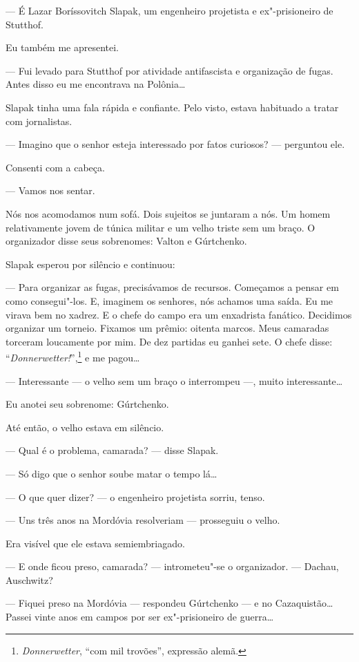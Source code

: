 --- É Lazar Boríssovitch Slapak, um engenheiro projetista e
ex"-prisioneiro de Stutthof.

Eu também me apresentei.

--- Fui levado para Stutthof por atividade antifascista e organização de
fugas. Antes disso eu me encontrava na Polônia\ldots{}

Slapak tinha uma fala rápida e confiante. Pelo visto, estava habituado a
tratar com jornalistas.

--- Imagino que o senhor esteja interessado por fatos curiosos? ---
perguntou ele.

Consenti com a cabeça.

--- Vamos nos sentar.

Nós nos acomodamos num sofá. Dois sujeitos se juntaram a nós. Um homem
relativamente jovem de túnica militar e um velho triste sem um braço. O
organizador disse seus sobrenomes: Valton e Gúrtchenko.

Slapak esperou por silêncio e continuou:

--- Para organizar as fugas, precisávamos de recursos. Começamos a
pensar em como consegui"-los. E, imaginem os senhores, nós achamos uma
saída. Eu me virava bem no xadrez. E o chefe do campo era um enxadrista
fanático. Decidimos organizar um torneio. Fixamos um prêmio: oitenta
marcos. Meus camaradas torceram loucamente por mim. De dez partidas eu
ganhei sete. O chefe disse: ``\emph{Donnerwetter!}'',\footnote{\emph{Donnerwetter}, ``com
  mil trovões'', expressão alemã.} e me pagou\ldots{}

--- Interessante --- o velho sem um braço o interrompeu ---, muito
interessante\ldots{}

Eu anotei seu sobrenome: Gúrtchenko.

Até então, o velho estava em silêncio.

--- Qual é o problema, camarada? --- disse Slapak.

--- Só digo que o senhor soube matar o tempo lá\ldots{}

--- O que quer dizer? --- o engenheiro projetista sorriu, tenso.

--- Uns três anos na Mordóvia resolveriam --- prosseguiu o velho.

Era visível que ele estava semiembriagado.

--- E onde ficou preso, camarada? --- intrometeu"-se o organizador. ---
Dachau, Auschwitz?

--- Fiquei preso na Mordóvia --- respondeu Gúrtchenko --- e no
Cazaquistão\ldots{} Passei vinte anos em campos por ser ex"-prisioneiro de
guerra\ldots{}

